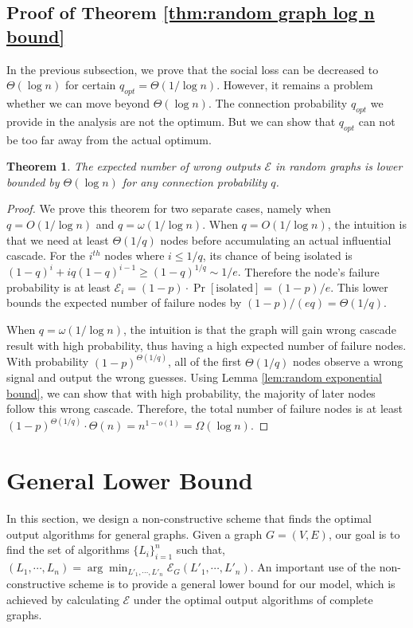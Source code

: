 \documentclass[a4paper,UKenglish]{lipics}
\newtheorem{thm}{Theorem}[section] %
\theoremstyle{definition}
\begin{document}
\subsection {Proof of Theorem \ref{thm:random graph log n bound}}
In the previous subsection, we prove that the social loss can be decreased to $\Theta(\log n)$ for certain $q_{opt} = \Theta(1 / \log n)$.
However, it remains a problem whether we can move beyond $\Theta(\log n)$.
The connection probability $q_{opt}$ we provide in the analysis are not the optimum.
But we can show that $q_{opt}$ can not be too far away from the actual optimum.
\begin{thm}
The expected number of wrong outputs $\mathcal{E}$ in random graphs is lower bounded by $\Theta(\log n)$ for any connection probability $q$.
\end{thm}
\begin{proof}
We prove this theorem for two separate cases, namely when $q = O(1 / \log n)$ and $q = \omega(1 / \log n)$. 
When $q = O(1 / \log n)$, the intuition is that we need at least $\Theta(1/q)$ nodes before accumulating an actual influential cascade.
For the $i^{th}$ nodes where $i \le 1/q$, its chance of being isolated is 
$
	(1 - q)^{i} + iq(1-q)^{i-1}
\ge
	(1 - q)^{1 / q}
\sim
	{1 / e}.
$
Therefore the node's failure probability is at least $\mathcal{E}_i = (1-p)\cdot\Pr[\text{isolated}] = (1-p)/e$.
This lower bounds the expected number of failure nodes by $(1-p)/(eq) = \Theta(1/q)$.

When $q = \omega(1 / \log n)$, 
	the intuition is that the graph will gain wrong cascade result with high probability,
	thus having a high expected number of failure nodes.
With probability $(1-p)^{\Theta(1/q)}$, all of the first $\Theta(1/q)$ nodes observe a wrong signal and output the wrong guesses.
Using Lemma \ref{lem:random exponential bound}, we can show that with high probability, the majority of later nodes follow this wrong cascade.
Therefore, the total number of failure nodes is at least
$
(1-p)^{\Theta(1/q)}\cdot \Theta(n) = n^{1 - o(1)} = \Omega(\log n).
$
\end{proof}









\section{General Lower Bound}
In this section, we design a non-constructive scheme that finds the optimal output algorithms for general graphs.
Given a graph $G = (V, E)$, our goal is to find the set of algorithms $\{L_i\}_{i=1}^{n}$ such that,
$
	(L_1, \dotsb, L_n)
=
	\arg\min_{L'_1, \dotsb, L'_n} \mathcal{E}_{G}(L'_1,\dotsb, L'_n).
$
An important use of the non-constructive scheme is to provide a general lower bound for our model,
	 which is achieved by calculating $\mathcal{E}$ under the optimal output algorithms of complete graphs.
\end{document}
